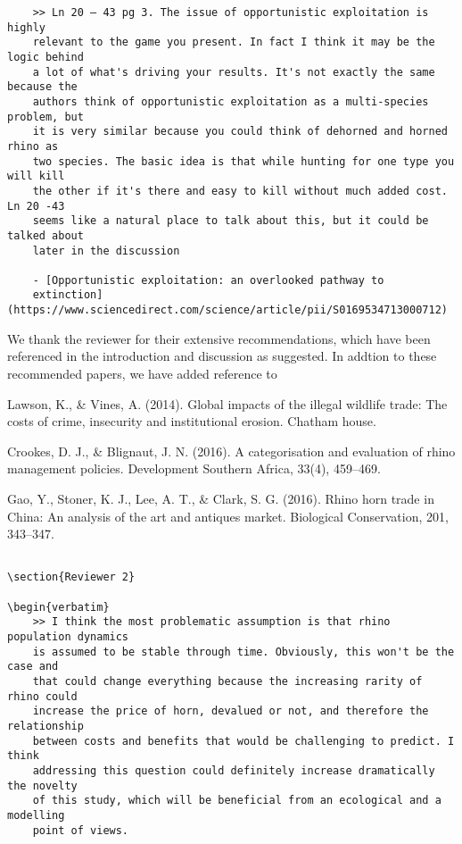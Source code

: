 \documentclass[10pt]{article}
\begin{document}
\begin{verbatim}
    >> Ln 20 – 43 pg 3. The issue of opportunistic exploitation is highly
    relevant to the game you present. In fact I think it may be the logic behind
    a lot of what's driving your results. It's not exactly the same because the
    authors think of opportunistic exploitation as a multi-species problem, but
    it is very similar because you could think of dehorned and horned rhino as
    two species. The basic idea is that while hunting for one type you will kill
    the other if it's there and easy to kill without much added cost.  Ln 20 -43
    seems like a natural place to talk about this, but it could be talked about
    later in the discussion

    - [Opportunistic exploitation: an overlooked pathway to
    extinction](https://www.sciencedirect.com/science/article/pii/S0169534713000712)
\end{verbatim}

We thank the reviewer for their extensive recommendations, which have been referenced in the introduction and discussion as suggested. 
In addtion to these recommended papers, we have added reference to 

Lawson, K., \& Vines, A. (2014). Global impacts of the illegal wildlife trade: The costs of crime, insecurity and institutional erosion. Chatham house.

Crookes, D. J., \& Blignaut, J. N. (2016). A categorisation and evaluation of rhino management policies. Development Southern Africa, 33(4), 459--469.

Gao, Y., Stoner, K. J., Lee, A. T., \& Clark, S. G. (2016). Rhino horn trade in China: An analysis of the art and antiques market. Biological Conservation, 201, 343--347.

\begin{verbatim}

\section{Reviewer 2}

\begin{verbatim}
    >> I think the most problematic assumption is that rhino population dynamics
    is assumed to be stable through time. Obviously, this won't be the case and
    that could change everything because the increasing rarity of rhino could
    increase the price of horn, devalued or not, and therefore the relationship
    between costs and benefits that would be challenging to predict. I think
    addressing this question could definitely increase dramatically the novelty
    of this study, which will be beneficial from an ecological and a modelling
    point of views.
\end{verbatim}
\end{document}
